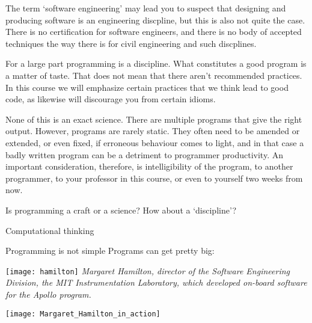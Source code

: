 The term `software engineering' may lead you to suspect
that designing and producing software is an engineering discpline,
but this is also not quite the case.
There is no certification for software engineers, and
there is no body of accepted techniques the way there is
for civil engineering and such discplines.

For a large part programming is a discipline. What constitutes a
good program is a matter of taste. That does not mean that there
aren't recommended practices. In this course we will emphasize certain
practices that we think lead to good code, as likewise will discourage
you from certain idioms.

None of this is an exact science. There are multiple programs that
give the right output. However, programs are rarely static. They often
need to be amended or extended, or even fixed, if erroneous behaviour
comes to light, and in that case a badly written program can be a
detriment to programmer productivity. An important consideration,
therefore, is intelligibility of the program, to another programmer,
to your professor in this course, or even to yourself two weeks from
now.

\begin{slide}{Is programming a craft or a science?}
  \label{sl:programmingcraft}
  How about a `discipline'?
\end{slide}

 {Computational thinking}

\begin{slide}{Programming is not simple}
  \label{sl:hamilton}
  \small
  Programs can get pretty big:

  \begin{multicols}{2}
    \texttt{[image: hamilton]}
    \vfill\columnbreak
    \textsl
    {\small Margaret Hamilton, director of the Software Engineering Division,
    the MIT Instrumentation Laboratory, which developed on-board
    software for the Apollo program.}\par
    \texttt{[image: Margaret\_Hamilton\_in\_action]}
    \vfill\hbox{}\columnbreak
  \end{multicols}



\end{slide}

